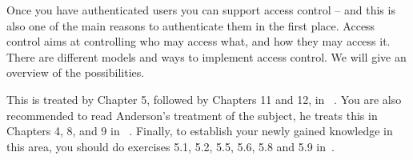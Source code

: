 Once you have authenticated users you can support access control -- and this is 
also one of the main reasons to authenticate them in the first place.
Access control aims at controlling who may access what, and how they may access 
it.
There are different models and ways to implement access control.
We will give an overview of the possibilities.

This is treated by Chapter 5, followed by Chapters 11 and 12, in 
~\cite{Gollmann2011cs}.
You are also recommended to read Anderson's treatment of the subject, he treats 
this in Chapters 4, 8, and 9 in 
~\cite{Anderson2008sea}.
Finally, to establish your newly gained knowledge in this area, you should do 
exercises 5.1, 5.2, 5.5, 5.6, 5.8 and 5.9 in~\cite{Gollmann2011cs}.
